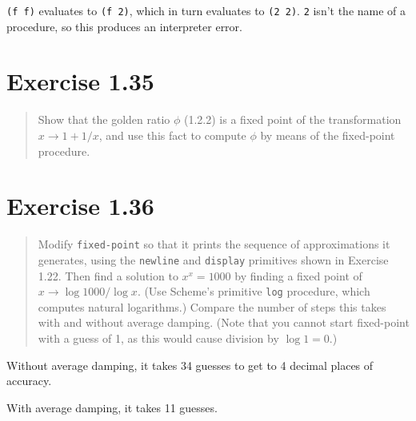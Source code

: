 \documentclass{article}
\begin{document}
\texttt{(f f)} evaluates to \texttt{(f 2)}, which in turn evaluates to
\texttt{(2 2)}. \texttt{2} isn't the name of a procedure, so this produces an
interpreter error.

\section{Exercise 1.35}
\begin{quote}
    Show that the golden ratio $\phi$ (1.2.2) is a fixed point of the
    transformation $x\rightarrow1+1/x$, and use this fact to compute $\phi$ by
    means of the fixed-point procedure.
\end{quote}



\section{Exercise 1.36}
\begin{quote}
    Modify \texttt{fixed-point} so that it prints the sequence of
    approximations it generates, using the \texttt{newline} and
    \texttt{display} primitives shown in Exercise 1.22.  Then find a solution
    to $x^x=1000$ by finding a fixed point of $x\rightarrow\log{1000}/\log{x}$.
    (Use Scheme’s primitive \texttt{log} procedure, which computes natural
    logarithms.) Compare the number of steps this takes with and without
    average damping. (Note that you cannot start fixed-point with a guess of 1,
    as this would cause division by $\log{1}=0$.)
\end{quote}


Without average damping, it takes 34 guesses to get to 4 decimal places of
accuracy.


With average damping, it takes 11 guesses.
\end{document}
